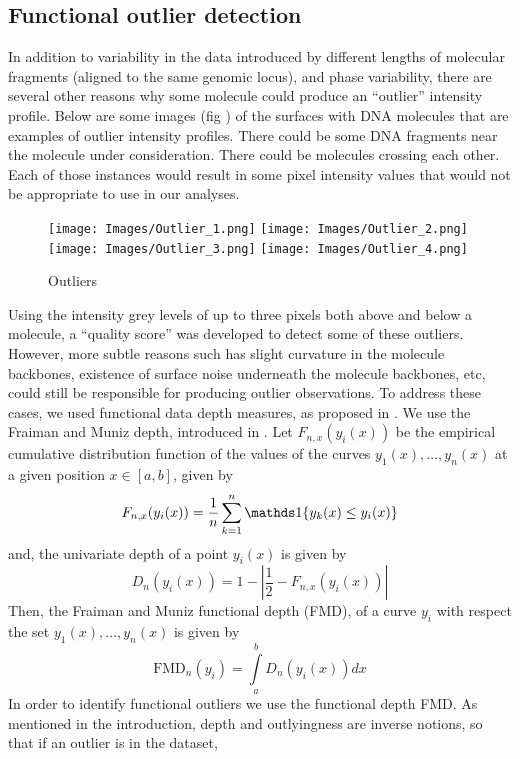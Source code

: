 \subsection{Functional outlier detection}
In addition to variability in the data introduced by different lengths of molecular fragments (aligned to the same genomic locus), and phase variability, there are several other reasons why some molecule could produce an ``outlier'' intensity profile. Below are some images (fig \cite{fig:Fig3_OutlierImages}) of the surfaces with DNA molecules that are examples of outlier intensity profiles. There could be some DNA fragments near the molecule under consideration. There could be molecules crossing each other. Each of those instances would result in some pixel intensity values that would not be appropriate to use in our analyses. 
\begin{figure}[H]
\begin{center}
\texttt{[image: Images/Outlier\_1.png]}
\texttt{[image: Images/Outlier\_2.png]}
\texttt{[image: Images/Outlier\_3.png]}
\texttt{[image: Images/Outlier\_4.png]}
\end{center}
\caption{Outliers}
\label{fig:Fig3_OutlierImages}
\end{figure}
Using the intensity grey levels of up to three pixels both above and below a molecule, a ``quality score'' was developed to detect some of these outliers. However, more subtle reasons such has slight curvature in the molecule backbones, existence of surface noise underneath the molecule backbones, etc, could still be responsible for producing outlier observations. To address these cases, we used functional data depth measures, as proposed in \cite{Febrero-Bande_etal_2007_Environmetrics}. We use the Fraiman and Muniz depth, introduced in \cite{Fraiman_Muniz_2001_SEIO}. Let $F_{n,x} (y_i (x))$ be the empirical cumulative distribution function of the values of the curves $y_1(x), \dots , y_n(x)$ at a given position $x \in [a, b]$, given by
\[ F_{n,x} (y_i (x)) = \frac{1}{n}\sum\limits_{k=1}^{n} \Ind\{ y_k(x) \leq y_i(x)\}\]
and, the univariate depth of a point $y_i(x)$ is given by
\[ D_n(y_i(x)) = 1 - \left| \frac{1}{2} - F_{n,x} (y_i (x)) \right| \]
Then, the Fraiman and Muniz functional depth (FMD), of a curve $y_i$ with respect the set $y_1(x), \dots , y_n(x)$ is given by 
\begin{equation}
\text{FMD}_n(y_i) = \int\limits_a^b D_n(y_i(x)) dx
\label{eq:3_depth}
\end{equation}
In order to identify functional outliers we use the functional depth FMD. As mentioned in the introduction, depth and outlyingness are inverse notions, so that if an outlier is in the dataset, 
